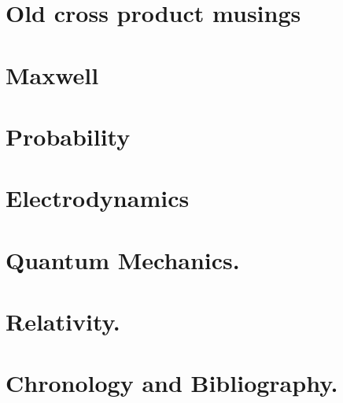 \documentclass[12pt,leqno]{book}
\begin{document}
\part{Old cross product musings}



\part{Maxwell}



\part{Probability}



\part{Electrodynamics}



\part{Quantum Mechanics.}












\part{Relativity.}











\part{Chronology and Bibliography.}





\end{document}
